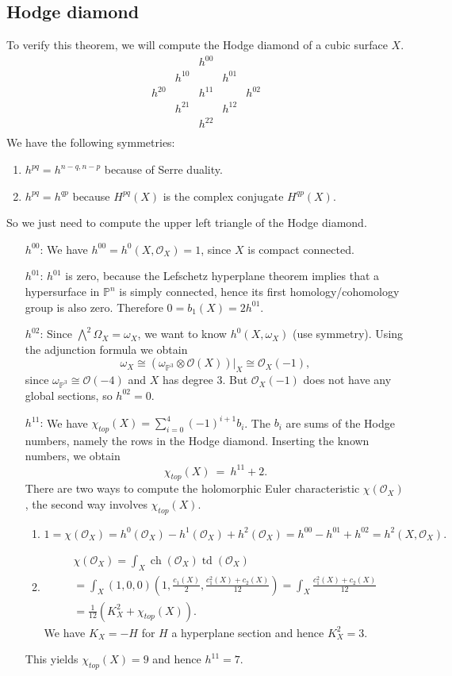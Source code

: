 \documentclass[a4paper, DIV=12]{scrreprt}
\newcommand{\OO}{{\mathcal O}}
\newcommand{\PP}{{\mathbb P}}
\DeclareMathOperator{\ch}{ch}
\DeclareMathOperator{\td}{td}
\begin{document}
\subsection*{Hodge diamond}
To verify this theorem, we will compute the Hodge diamond of a cubic surface $X$.
\[
\begin{array}{ccccc}
&&h^{00}&&\\
& h^{10} && h^{01} & \\
h^{20} && h^{11} && h^{02}\\
& h^{21} && h^{12} & \\
&&h^{22}&&\\
\end{array}
\]
We have the following symmetries:
\begin{enumerate}
\item $h^{pq}=h^{n-q,n-p}$ because of Serre duality.
\item $h^{pq}=h^{qp}$ because $H^{pq}(X)$ is the complex conjugate $H^{qp}(X)$.
\end{enumerate}
So we just need to compute the upper left triangle of the Hodge diamond.
\begin{itemize}
\item[$h^{00}$:] We have $h^{00}=h^0(X,\OO_X)=1$, since $X$ is compact connected.
\item[$h^{01}$:] $h^{01}$ is zero, because the Lefschetz hyperplane theorem implies that a hypersurface in $\PP^n$ is simply connected, hence its first homology/cohomology group is also zero. Therefore $0=b_1(X)=2h^{01}$.
\item[$h^{02}$:] Since $\bigwedge^2\Omega_X=\omega_X$, we want to know $h^0(X,\omega_X)$ (use symmetry). Using the adjunction formula we obtain
\[
\omega_X\cong (\omega_{\PP^3}\otimes \OO(X))|_{X}\cong \OO_X(-1),
\]
since $\omega_{\PP^3}\cong\OO(-4)$ and $X$ has degree $3$. But $\OO_X(-1)$ does not have any global sections, so $h^{02}=0$.
\item[$h^{11}$:] We have $\chi_{top}(X)=\sum_{i=0}^4(-1)^{i+1}b_i$. The $b_i$ are sums of the Hodge numbers, namely the rows in the Hodge diamond. Inserting the known numbers, we obtain
\[
\chi_{top}(X)\ =\ h^{11} + 2.
\]
There are two ways to compute the holomorphic Euler characteristic $\chi(\OO_X)$, the second way involves $\chi_{top}(X)$.
\begin{enumerate}
\item 
\[
1=\chi(\OO_X)=h^0(\OO_X)-h^1(\OO_X) + h^2(\OO_X) = h^{00} - h^{01} + h^{02} = h^2(X,\OO_X).
\]
\item 
\begin{align*}
\chi(\OO_X) = \int_X\ch(\OO_X)\td(\OO_X)\\
=\int_X(1,0,0)(1,\frac{c_1(X)}{2},\frac{c_1^2(X) + c_2(X)}{12}) = \int_X\frac{c_1^2(X) + c_2(X)}{12}\\
=\frac{1}{12}(K_X^2+\chi_{top}(X)).
\end{align*}
We have $K_X=-H$ for $H$ a hyperplane section and hence $K_X^2=3$.
\end{enumerate}
This yields $\chi_{top}(X)=9$ and hence $h^{11}=7$.
\end{itemize}
\end{document}
